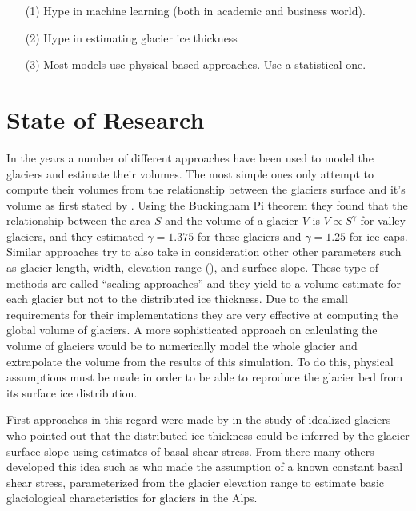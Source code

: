 \begin{itemize}
	\item[(1)] Hype in machine learning (both in academic and business world).
	\item[(2)] Hype in estimating glacier ice thickness
	\item[(3)] Most models use physical based approaches. Use a statistical one.
\end{itemize}
 


\section{State of Research}\label{research}
In the years a number of different approaches have been used to model the glaciers and estimate their volumes.
The most simple ones only attempt to compute their volumes from the relationship between the glaciers surface and it's volume as first stated by \citet{bahr1997}. Using the Buckingham Pi
theorem they found that the relationship between the area $S$ and the volume of a glacier $V$ is $V \propto S^{\gamma}$ for valley glaciers, and they estimated $\gamma=1.375$ for these glaciers and $\gamma=1.25$ for ice caps. Similar approaches try to also take in consideration other other parameters such as glacier length, width, elevation range (\cite{Grinsted2013}), and surface slope. These type of methods are called ``scaling approaches'' and they yield to a volume estimate for each glacier but not to the distributed ice thickness. Due to the small requirements for their implementations they are very effective at computing the global volume of glaciers.
A more sophisticated approach on calculating the volume of glaciers would be to numerically model the whole glacier and extrapolate the volume from the results of this simulation. To do this, physical assumptions must be made in order to be able to reproduce the glacier bed from its surface ice distribution.

First approaches in this regard were made by \citet{Nye1965} in the study of  idealized glaciers who pointed out that the distributed ice thickness could be inferred by the glacier surface slope using estimates of basal shear stress. From there many others developed this idea such as \citet{haeberli1995} who made the assumption of a known constant basal shear stress, parameterized from the glacier elevation range to estimate basic glaciological characteristics for glaciers in the Alps. 

